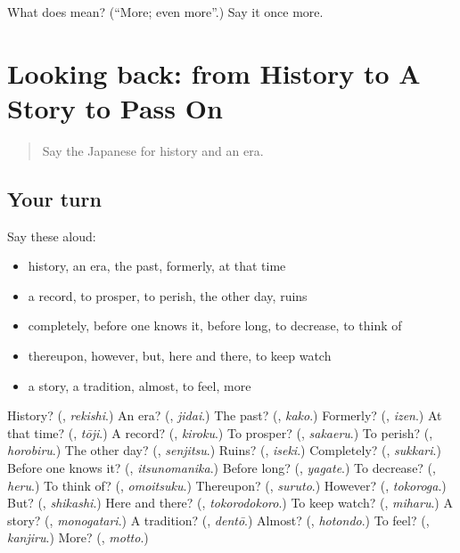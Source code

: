 \begin{tcolorbox}[breakable,colback=teal!4,colframe=teal!35!black,title={Before you move on}]
What does  mean? (\textquotedblleft{}More; even more\textquotedblright{}.) Say it once more.
\end{tcolorbox}
\section[(dialogue)]{Looking back: from History to A Story to Pass On}

\label{lesson:JA-R316-review-312-316}



\begin{quote}
Say the Japanese for history and an era.
\end{quote}

\subsection*{Your turn}
Say these aloud:

\begin{itemize}
\raggedright
  \item history, an era, the past, formerly, at that time
  \item a record, to prosper, to perish, the other day, ruins
  \item completely, before one knows it, before long, to decrease, to think of
  \item thereupon, however, but, here and there, to keep watch
  \item a story, a tradition, almost, to feel, more
\end{itemize}

\begin{tcolorbox}[breakable,colback=teal!4,colframe=teal!35!black,title={Before you move on}]
History? (\textbf{}, \emph{rekishi}.) An era? (\textbf{}, \emph{jidai}.) The past? (\textbf{}, \emph{kako}.) Formerly? (\textbf{}, \emph{izen}.) At that time? (\textbf{}, \emph{tōji}.) A record? (\textbf{}, \emph{kiroku}.) To prosper? (\textbf{}, \emph{sakaeru}.) To perish? (\textbf{}, \emph{horobiru}.) The other day? (\textbf{}, \emph{senjitsu}.) Ruins? (\textbf{}, \emph{iseki}.) Completely? (\textbf{}, \emph{sukkari}.) Before one knows it? (\textbf{}, \emph{itsunomanika}.) Before long? (\textbf{}, \emph{yagate}.) To decrease? (\textbf{}, \emph{heru}.) To think of? (\textbf{}, \emph{omoitsuku}.) Thereupon? (\textbf{}, \emph{suruto}.) However? (\textbf{}, \emph{tokoroga}.) But? (\textbf{}, \emph{shikashi}.) Here and there? (\textbf{}, \emph{tokorodokoro}.) To keep watch? (\textbf{}, \emph{miharu}.) A story? (\textbf{}, \emph{monogatari}.) A tradition? (\textbf{}, \emph{dentō}.) Almost? (\textbf{}, \emph{hotondo}.) To feel? (\textbf{}, \emph{kanjiru}.) More? (\textbf{}, \emph{motto}.)
\end{tcolorbox}
